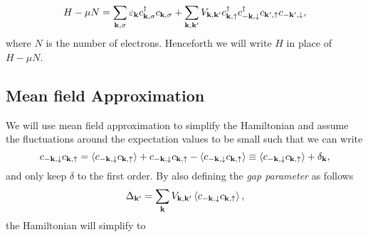 \begin{equation}
    H-\mu N = \sum_{\bf{k},\sigma} \varepsilon_{\bf{k}} c_{\bf{k},\sigma}^{\dagger} c_{\bf{k},\sigma} + \sum_{\bf{k,k'}} V_{\bf{k,k'}} c_{\bf{k},\uparrow}^{\dagger} c_{\bf{-k},\downarrow}^{\dagger}  c_{\bf{k'},\uparrow} c_{-\bf{k'},\downarrow},
    \label{Ham-2-2}
\end{equation}
where $N$ is the number of electrons. Henceforth we will write $H$ in place of $H-\mu N$. 

\subsection{Mean field Approximation}
We will use mean field approximation to simplify the Hamiltonian and assume the fluctuations around the expectation values to be small such that we can write 
\begin{equation}
    c_{-\bf{k},\downarrow}c_{\bf{k},\uparrow} = \left< c_{-\bf{k},\downarrow} c_{\bf{k},\uparrow} \right> + c_{-\bf{k},\downarrow}c_{\bf{k},\uparrow} - \left< c_{-\bf{k},\downarrow} c_{\bf{k},\uparrow} \right> \equiv \left< c_{-\bf{k},\downarrow} c_{\bf{k},\uparrow} \right> + \delta_{\bf{k}},
\end{equation}
and only keep $\delta$ to the first order. By also defining the \textit{gap parameter} as follows
\begin{equation}
    \Delta_{\bf{k'}} = \sum_{\bf{k}} V_{\bf{k,k'}}\left< c_{-\bf{k},\downarrow} c_{\bf{k},\uparrow} \right>,
\label{gap}
\end{equation}
the Hamiltonian will simplify to
